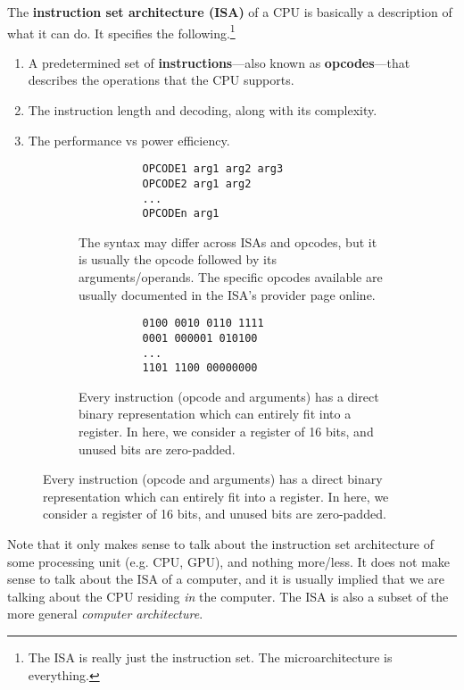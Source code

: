   \begin{definition}
    The \textbf{instruction set architecture (ISA)} of a CPU is basically a description of what it can do. It specifies the following.\footnote{The ISA is really just the instruction set. The microarchitecture is everything. } 
    \begin{enumerate}
      \item A predetermined set of \textbf{instructions}---also known as \textbf{opcodes}---that describes the operations that the CPU supports. 
      \item The instruction length and decoding, along with its complexity. 
      \item The performance vs power efficiency. 
    \end{enumerate}

    \begin{figure}[H]
      \centering
      \begin{subfigure}[b]{0.48\textwidth}
        \centering
        \begin{lstlisting}
          OPCODE1 arg1 arg2 arg3 
          OPCODE2 arg1 arg2
          ...
          OPCODEn arg1 
        \end{lstlisting}
        \caption{The syntax may differ across ISAs and opcodes, but it is usually the opcode followed by its arguments/operands. The specific opcodes available are usually documented in the ISA's provider page online.}
      \end{subfigure}
      \hfill 
      \begin{subfigure}[b]{0.48\textwidth}
        \centering
        \begin{lstlisting}
          0100 0010 0110 1111 
          0001 000001 010100
          ... 
          1101 1100 00000000 
        \end{lstlisting}
        \caption{Every instruction (opcode and arguments) has a direct binary representation which can entirely fit into a register. In here, we consider a register of 16 bits, and unused bits are zero-padded.}
      \end{subfigure}
      \label{fig:isa_syntax}
    \end{figure}
  \end{definition}

  Note that it only makes sense to talk about the instruction set architecture of some processing unit (e.g. CPU, GPU), and nothing more/less. It does not make sense to talk about the ISA of a computer, and it is usually implied that we are talking about the CPU residing \textit{in} the computer. The ISA is also a subset of the more general \textit{computer architecture}. 

